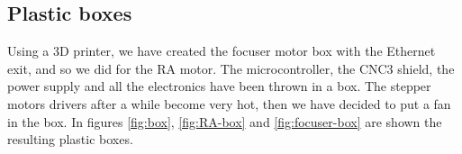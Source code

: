 \subsection{Plastic boxes}
Using a 3D printer, we have created the focuser motor box with the Ethernet exit, and so we did for the RA motor.
The microcontroller, the CNC3 shield, the power supply and all the electronics have been thrown in a box.
The stepper motors drivers after a while become very hot, then we have decided to put a fan in the box.
In figures \ref{fig:box}, \ref{fig:RA-box} and \ref{fig:focuser-box} are shown the resulting plastic boxes.